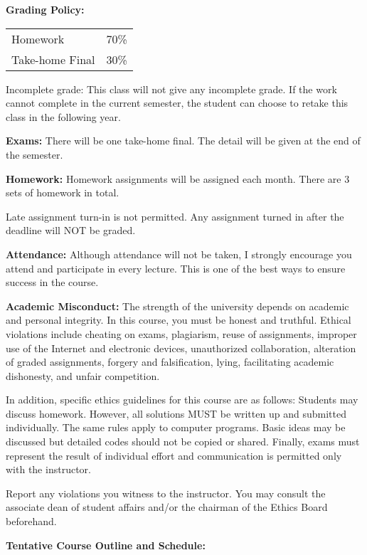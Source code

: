 \documentclass[a4paper,10pt]{article}
\begin{document}
\textbf{Grading Policy:}

\begin{tabular}{lr}
Homework & 70\%\\ 
Take-home Final & 30\% \\
\end{tabular}

Incomplete grade: This class will not give any
incomplete grade. If the work cannot complete in the
current semester, the student can choose to retake this
class in the following year.




\textbf{Exams:} There will be one take-home final. The detail will be given at the end of the semester. 


\textbf{Homework:} Homework assignments will be assigned each month. There are 3 sets of homework in total. 

Late assignment turn-in is not permitted. Any assignment turned in after the deadline will NOT be graded.




\textbf{Attendance:} Although attendance will not be taken, I strongly encourage you attend and participate in every lecture. This is one of the best ways to ensure success in the course.






\textbf{Academic Misconduct:} The strength of the university depends on academic and personal integrity. In this course, you must be honest 
and truthful. Ethical violations include cheating on exams, plagiarism, reuse of assignments, improper use 
of the Internet and electronic devices, unauthorized collaboration, alteration of graded assignments, forgery 
and falsification, lying, facilitating academic dishonesty, and unfair competition.

In addition, specific ethics guidelines for this course are as follows: Students may discuss homework. However, 
all solutions MUST be written up and submitted individually. The same rules apply to computer programs. 
Basic ideas may be discussed but detailed codes should not be copied or shared. Finally, exams must 
represent the result of individual effort and communication is permitted only with the instructor.

Report any violations you witness to the instructor. You may consult the associate dean of student affairs 
and/or the chairman of the Ethics Board beforehand. 

\textbf{Tentative Course Outline and Schedule:}
\end{document}
